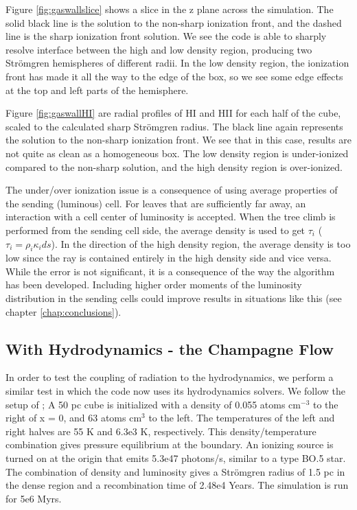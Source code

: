 Figure \ref{fig:gaswallslice} shows a slice in the z plane across the simulation. The solid black line is the solution to the non-sharp ionization front, and the dashed line is the sharp ionization front solution. We see the code is able to sharply resolve interface between the high and low density region, producing two Str\"omgren hemispheres of different radii. In the low density region, the ionization front has made it all the way to the edge of the box, so we see some edge effects at the top and left parts of the hemisphere.

Figure \ref{fig:gaswallHI} are radial profiles of HI and HII for each half of the cube, scaled to the calculated sharp Str\"omgren radius. The black line again represents the solution to the non-sharp ionization front. We see that in this case, results are not quite as clean as a homogeneous box. The low density region is under-ionized compared to the non-sharp solution, and the high density region is over-ionized.

The under/over ionization issue is a consequence of using average properties of the sending (luminous) cell. For leaves that are sufficiently far away, an interaction with a cell center of luminosity is accepted. When the tree climb is performed from the sending cell side, the average density is used to get $\tau_i$ ($\tau_i = \rho_i \kappa_i ds$). In the direction of the high density region, the average density is too low since the ray is contained entirely in the high density side and vice versa. While the error is not significant, it is a consequence of the way the algorithm has been developed. Including higher order moments of the luminosity distribution in the sending cells could improve results in situations like this (see chapter \ref{chap:conclusions}).

\subsection{With Hydrodynamics - the Champagne Flow}
\label{sec:champagne}

In order to test the coupling of radiation to the hydrodynamics, we perform a similar test in which the code now uses its hydrodynamics solvers. We follow the setup of \citet{gendelevKrumholz12}; A 50 pc cube is initialized with a density of 0.055 atoms cm$^{-3}$ to the right of x = 0, and 63 atoms cm$^{3}$ to the left. The temperatures of the left and right halves are 55 K and 6.3e3 K, respectively. This density/temperature combination gives pressure equilibrium at the boundary. An ionizing source is turned on at the origin that emits 5.3e47 photons/s, similar to a type BO.5 star. The combination of density and luminosity gives a Str\"omgren radius of 1.5 pc in the dense region and a recombination time of 2.48e4 Years. The simulation is run for 5e6 Myrs.

